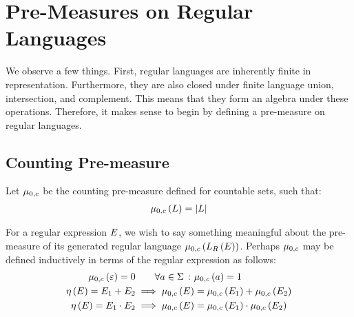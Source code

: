 \section{Pre-Measures on Regular Languages}
We observe a few things.
First, regular languages are inherently finite in representation.
Furthermore, they are also closed under finite language union,
intersection, and complement.
This means that they form an algebra under these operations.
Therefore, it makes sense to begin by defining a pre-measure on
regular languages.

\subsection{Counting Pre-measure}
Let \(\mu_{0, c}\) be the counting pre-measure defined for countable sets,
such that:
\begin{align*}
  \mu_{0, c}\left(L\right) = \left\lvert L\right\rvert
\end{align*}

For a regular expression \(E\),
we wish to say something meaningful about the pre-measure of its
generated regular language
\(\mu_{0, c}\left(L_{R}\left(E\right)\right)\).
Perhaps \(\mu_{0, c}\) may be defined inductively in terms of
the regular expression as follows:
\begin{align*}
  \mu_{0, c}\left(\varepsilon\right) = 0
    &\qquad \forall a \in \Sigma \ \colon \mu_{0, c}\left(a\right) = 1 \\
  \eta\left(E\right) = E_1 + E_2
    &\implies
      \mu_{0, c}\left(E\right) =
        \mu_{0, c}\left(E_1\right) + \mu_{0, c}\left(E_2\right) \\
  \eta\left(E\right) = E_1 \cdot E_2
    &\implies
      \mu_{0, c}\left(E\right) =
        \mu_{0, c}\left(E_1\right) \cdot \mu_{0, c}\left(E_2\right) \\
\end{align*}


